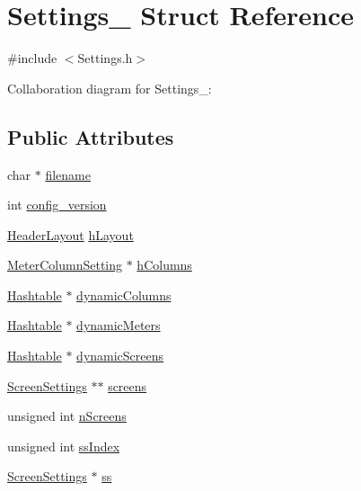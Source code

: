 \hypertarget{structSettings__}{}\section{Settings\+\_\+ Struct Reference}
\label{structSettings__}


{\ttfamily \#include $<$Settings.\+h$>$}



Collaboration diagram for Settings\+\_\+\+:
\subsection*{Public Attributes}
\begin{DoxyCompactItemize}
\item 
char $\ast$ \hyperlink{structSettings___a8a11e86f130881a6a8e17a81129beef8}{filename}
\item 
int \hyperlink{structSettings___a4590e04209dcc4634147fc46032aed97}{config\+\_\+version}
\item 
\hyperlink{HeaderLayout_8h_afc9cb7b84041249bac419260f679b6a9}{Header\+Layout} \hyperlink{structSettings___a97c91690ba0365df82b39a0291daeb36}{h\+Layout}
\item 
\hyperlink{structMeterColumnSetting}{Meter\+Column\+Setting} $\ast$ \hyperlink{structSettings___ac370b5d9729d5a0f13a43a9df5e334c2}{h\+Columns}
\item 
\hyperlink{Hashtable_8h_af67f943dab16c5d7d465c18053edf47f}{Hashtable} $\ast$ \hyperlink{structSettings___a197cb04784c1ece522b5c3353aff4257}{dynamic\+Columns}
\item 
\hyperlink{Hashtable_8h_af67f943dab16c5d7d465c18053edf47f}{Hashtable} $\ast$ \hyperlink{structSettings___a8c4b6216d063350aa38d003bb2fbf359}{dynamic\+Meters}
\item 
\hyperlink{Hashtable_8h_af67f943dab16c5d7d465c18053edf47f}{Hashtable} $\ast$ \hyperlink{structSettings___afb8a0571062761c4c7d388f43d908faf}{dynamic\+Screens}
\item 
\hyperlink{Settings_8h_a86d3dc963e563d775d50b8cc2b77afb8}{Screen\+Settings} $\ast$$\ast$ \hyperlink{structSettings___aa0f44c97ee6868be49327f4fa9c4580d}{screens}
\item 
unsigned int \hyperlink{structSettings___a42c8d91837850b2ac1107eed28a1579a}{n\+Screens}
\item 
unsigned int \hyperlink{structSettings___a73cb2d6902ec939990de193bac96efb7}{ss\+Index}
\item 
\hyperlink{Settings_8h_a86d3dc963e563d775d50b8cc2b77afb8}{Screen\+Settings} $\ast$ \hyperlink{structSettings___a8c692092a7b56011a25207960937a57e}{ss}
$$
\end{DoxyCompactItemize}
